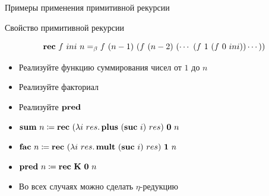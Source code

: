     \begin{frame}[fragile]{Примеры применения примитивной рекурсии}
        \begin{block}{Свойство примитивной рекурсии}
            \vspace{-0.5em}

            \[\mathbf{rec}~f~ini~n =_\beta f~(n-1)~(f~(n-2)~(\cdots~(f~1~(f~0~ini))\cdots))\]
        \end{block}
        \vspace{1em}
        \begin{itemize}
            \item[\todo] Реализуйте функцию суммирования чисел от $1$ до $n$
            \item[\todo] Реализуйте факториал
            \item[\todo] Реализуйте $\mathbf{pred}$
            \item[\answer] \pause $\mathbf{sum} ~ n \coloneqq \mathbf{rec} ~ (\lambda i ~ res \ldotp \mathbf{plus} ~ (\mathbf{suc} ~ i) ~ res) ~ \mathbf{0} ~ n$
            \item[\answer] \pause $\mathbf{fac} ~ n
            \coloneqq
            \mathbf{rec}
            ~ (\lambda i ~ res \ldotp \mathbf{mult} ~ (\mathbf{suc} ~ i) ~ res)
            ~ \mathbf{1} ~ n$
            \item[\answer] \pause $\mathbf{pred} ~ n \coloneqq \mathbf{rec}~\mathbf{K}~\mathbf{0} ~ n$
            \item Во всех случаях можно сделать $\eta$-редукцию
        \end{itemize}
    \end{frame}

